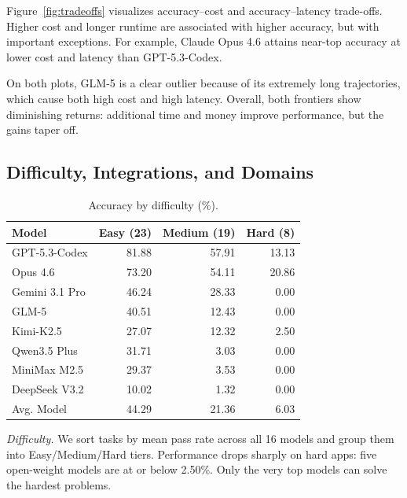 Figure~\ref{fig:tradeoffs} visualizes accuracy--cost and accuracy--latency trade-offs. Higher cost and longer runtime are associated with higher accuracy, but with important exceptions. For example, Claude Opus 4.6 attains near-top accuracy at lower cost and latency than GPT-5.3-Codex.

On both plots, GLM-5 is a clear outlier because of its extremely long trajectories, which cause both high cost and high latency. Overall, both frontiers show diminishing returns: additional time and money improve performance, but the gains taper off.

\subsection{Difficulty, Integrations, and Domains}


\begin{table}[!h]
\caption{Accuracy by difficulty (\%).}
\label{tab:difficulty}
\small
\begin{tabular}{@{}lrrr@{}}
\toprule
\textbf{Model} & \textbf{Easy (23)} & \textbf{Medium (19)} & \textbf{Hard (8)} \\
\midrule
GPT-5.3-Codex & 81.88 & 57.91 & 13.13 \\
Opus 4.6 & 73.20 & 54.11 & 20.86 \\
Gemini 3.1 Pro & 46.24 & 28.33 & 0.00 \\
GLM-5 & 40.51 & 12.43 & 0.00 \\
Kimi-K2.5 & 27.07 & 12.32 & 2.50 \\
Qwen3.5 Plus & 31.71 & 3.03 & 0.00 \\
MiniMax M2.5 & 29.37 & 3.53 & 0.00 \\
DeepSeek V3.2 & 10.02 & 1.32 & 0.00 \\
Avg. Model & 44.29 & 21.36 & 6.03 \\
\bottomrule
\end{tabular}
\end{table}

\textit{Difficulty.} We sort tasks by mean pass rate across all 16 models and group them into Easy/Medium/Hard tiers. Performance drops sharply on hard apps: five open-weight models are at or below 2.50\%. Only the very top models can solve the hardest problems. 


